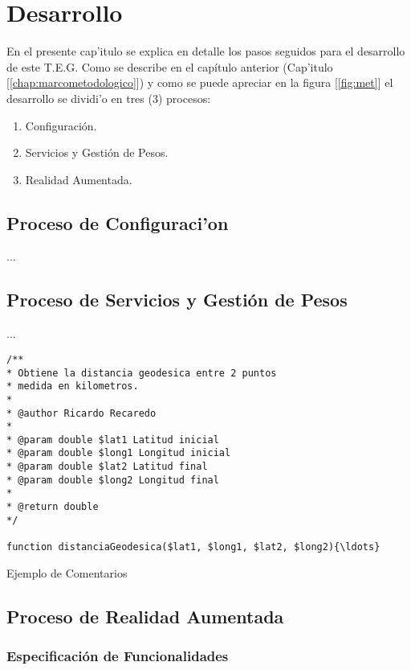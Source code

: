 \chapter{Desarrollo}
\label{chap:desarrollo}

En el presente cap'itulo se explica en detalle los pasos seguidos para el desarrollo de este T.E.G. Como se describe en el cap\'itulo anterior (Cap'itulo  [\ref{chap:marcometodologico}]) y como se puede apreciar en la figura [\ref{fig:met}] el desarrollo se dividi'o en tres (3) procesos:

\begin{enumerate}
\item Configuraci\'on.
\item Servicios y Gesti\'on de Pesos.
\item Realidad Aumentada.
\end{enumerate}

\section{Proceso de Configuraci'on}

...

\section{Proceso de Servicios y Gesti\'on de Pesos}

...

\renewcommand{\baselinestretch}{1}

\begin{algorithm}[H]
{\footnotesize
\begin{verbatim}
/**
* Obtiene la distancia geodesica entre 2 puntos
* medida en kilometros.
* 
* @author Ricardo Recaredo
*
* @param double $lat1 Latitud inicial
* @param double $long1 Longitud inicial
* @param double $lat2 Latitud final
* @param double $long2 Longitud final
*
* @return double 
*/

function distanciaGeodesica($lat1, $long1, $lat2, $long2){\ldots}
\end{verbatim}
}
\caption{\footnotesize Ejemplo de Comentarios}
\end{algorithm}

\renewcommand{\baselinestretch}{1.5}



\section{Proceso de Realidad Aumentada}
\label{sec:pdra}

\subsection{Especificaci\'on de Funcionalidades}

\newpage

